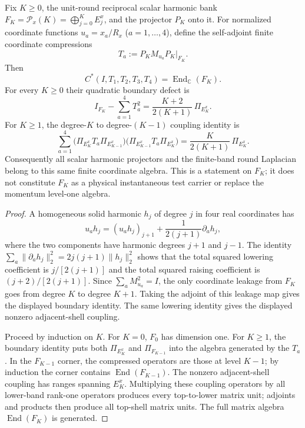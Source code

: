 \documentclass[12pt,a4paper]{article}
\begin{document}
\begin{theorem}
\label{p2c:thm:finite-scalar-coordinate-full-algebra}
Fix $K\ge0$, the unit-round reciprocal scalar harmonic bank
$F_K=\mathcal P_x(K)=\bigoplus_{j=0}^K E_j^x$, and the projector
$P_K$ onto it. For normalized coordinate functions
$u_a=x_a/R_x$ ($a=1,\ldots,4$), define the self-adjoint finite
coordinate compressions
\[
 T_a:=P_K M_{u_a}P_K|_{F_K}.
\]
Then
\[
 \boxed{C^*(I,T_1,T_2,T_3,T_4)=\operatorname{End}_{\mathbb C}(F_K).}
\]
For every $K\ge0$ their quadratic boundary defect is
\[
 \boxed{I_{F_K}-\sum_{a=1}^4T_a^2
 =\frac{K+2}{2(K+1)}\,\Pi_{E_K^x}.}
\]
For $K\ge1$, the degree-$K$ to degree-$(K-1)$ coupling identity is
\[
 \sum_{a=1}^4
 \bigl(\Pi_{E_K^x}T_a\Pi_{E_{K-1}^x}\bigr)
 \bigl(\Pi_{E_{K-1}^x}T_a\Pi_{E_K^x}\bigr)
 =\frac{K}{2(K+1)}\,\Pi_{E_K^x}.
\]
Consequently all scalar harmonic projectors and the finite-band
round Laplacian belong to this same finite coordinate algebra. This
is a statement on $F_K$; it does not constitute $F_K$ as a physical
instantaneous test carrier or replace the momentum level-one algebra.
\end{theorem}
\begin{proof}
A homogeneous solid harmonic $h_j$ of degree $j$ in four real
coordinates has
\[
 u_a h_j=(u_ah_j)_{j+1}+\frac{1}{2(j+1)}\partial_a h_j,
\]
where the two components have harmonic degrees $j+1$ and $j-1$.
The identity
$\sum_a\|\partial_a h_j\|_2^2=2j(j+1)\|h_j\|_2^2$
shows that the total squared lowering coefficient is
$j/[2(j+1)]$ and the total squared raising coefficient is
$(j+2)/[2(j+1)]$. Since $\sum_aM_{u_a}^2=I$, the only
coordinate leakage from $F_K$ goes from degree $K$ to degree $K+1$.
Taking the adjoint of this leakage map gives the displayed boundary
identity. The same lowering identity gives the displayed nonzero
adjacent-shell coupling.

Proceed by induction on $K$. For $K=0$, $F_0$ has dimension one.
For $K\ge1$, the boundary identity puts both $\Pi_{E_K^x}$ and
$\Pi_{F_{K-1}}$ into the algebra generated by the $T_a$. In the
$F_{K-1}$ corner, the compressed operators are those at level $K-1$;
by induction the corner contains $\operatorname{End}(F_{K-1})$.
The nonzero adjacent-shell coupling has ranges spanning $E_K^x$.
Multiplying these coupling operators by all lower-band rank-one
operators produces every top-to-lower matrix unit; adjoints and
products then produce all top-shell matrix units. The full matrix
algebra $\operatorname{End}(F_K)$ is generated.
\end{proof}
\end{document}
